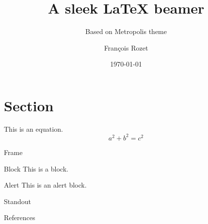 \documentclass[12pt]{beamer}
\title{A sleek \LaTeX{} beamer}
\subtitle{Based on Metropolis theme}
\author{François Rozet}
\institute{University of Liège}
\date{\today}
\begin{document}
\maketitle

\section{Section}

\begin{frame}
    This is an equation. $$ a^2 + b^2 = c^2 $$
\end{frame}

\begin{frame}{Frame}
    \begin{block}{Block}
        This is a block.
    \end{block}

    \begin{alertblock}{Alert}
        This is an \alert{alert} block.
    \end{alertblock}

\end{frame}

\begin{frame}[standout]
    Standout
\end{frame}

\begin{frame}[allowframebreaks]{References}
    \nocite{einstein}
    \nocite{knuthwebsite}
    \nocite{dirac}
    \printbibliography[heading=none]
\end{frame}
\end{document}
